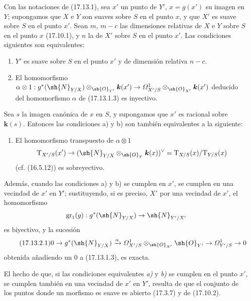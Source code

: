 \begin{proposition}[17.13.2]
\label{IV.17.13.2}
Con las notaciones de \textup{(17.13.1)}, sea $x'$ un punto de $Y'$, $x=g(x')$ su imagen en $Y$; supongamos que $X$ e $Y$ son suaves sobre $S$ en el punto $x$, y que $X'$ es suave sobre $S$ en el punto $x'$. Sean $m$, $m-c$ las dimensiones relativas de $X$ e $Y$ sobre $S$ en el punto $x$ \textup{(17.10.1)}, y $n$ la de $X'$ sobre $S$ en el punto $x'$. Las condiciones siguientes son equivalentes:
\begin{enumerate}
  \item[\textup{a)}] $Y'$ es suave sobre $S$ en el punto $x'$ y de dimensión relativa $n-c$.
  \item[\textup{b)}] El homomorfismo $\alpha\otimes1:g^*(\sh{N}_{Y/X})\otimes_{\sh{O}_{Y'}}\boldsymbol{k}(x')\to\varOmega^1_{X'/S}\otimes_{\sh{O}_{X'}}\boldsymbol{k}(x')$ deducido del homomorfismo $\alpha$ de \textup{(17.13.1.3)} es inyectivo.
\end{enumerate}
Sea $s$ la imagen canónica de $x$ en $S$, y supongamos que $x'$ es racional sobre $\boldsymbol{k}(s)$. Entonces las condiciones \textup{a)} y \textup{b)} son también equivalentes a la siguiente:
\begin{enumerate}
  \item[\textup{b$'$)}] El homomorfismo transpuesto de $\alpha\otimes1$
  \[
  \mathrm{T}_{X'/S}(x')\to(\sh{N}_{Y/X}\otimes_{\sh{O}_Y}\boldsymbol{k}(x))^\vee=\mathrm{T}_{X/S}(x)/\mathrm{T}_{Y/S}(x)
  \]
  \textup{(cf. (16.5.12))} es sobreyectivo.
\end{enumerate}
Además, cuando las condiciones \textup{a)} y \textup{b)} se cumplen en $x'$, se cumplen en una vecindad de $x'$ en $Y'$; sustituyendo, si es preciso, $X'$ por una vecindad de $x'$, el homomorfismo
\[
\operatorname{gr}_1(g):g^*(\sh{N}_{Y/X})\to\sh{N}_{Y'/X'}
\]
es biyectivo, y la sucesión
\[
\label{IV.17.13.2.1}
\tag{17.13.2.1}
0\to g^*(\sh{N}_{Y/X})\xrightarrow{\alpha}\varOmega^1_{X'/S}\otimes_{\sh{O}_{X'}}\sh{O}_{Y'}\to\varOmega^1_{Y'/S}\to0
\]
obtenida añadiendo un $0$ a \textup{(17.13.1.3)}, es exacta.
\end{proposition}

El hecho de que, si las condiciones equivalentes \emph{a)} y \emph{b)} se cumplen en el punto $x'$, se cumplen también en una vecindad de $x'$ en $Y'$, resulta de que el conjunto de los puntos donde un morfismo es suave es abierto (17.3.7) y de (17.10.2).

